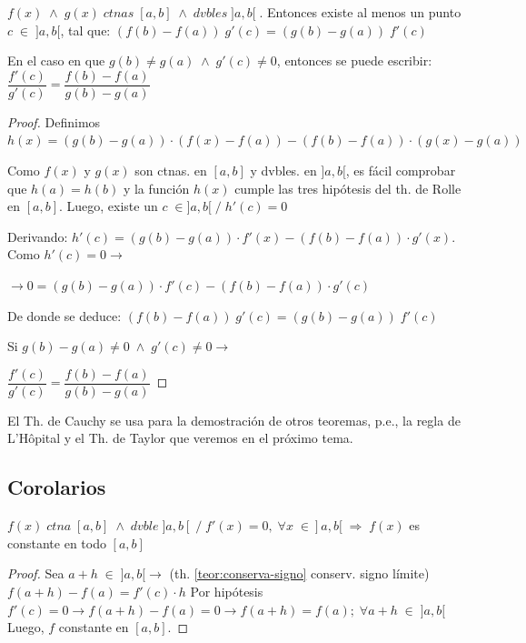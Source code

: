 	\begin{teor}
	\label{ThCauchy}
	$f(x) \;  \wedge \; g(x) \; ctnas\;  [a,b]\; \wedge \;  dvbles \;  ]a,b[ \; $. Entonces existe al menos un punto $c\; \in\; ]a,b[$, tal que:
	$\left(f(b)-f(a) \right)\; g'(c)= \left(g(b)-g(a) \right)\; f'(c)$
	
	En el caso en que $g(b) \neq g(a) \; \wedge \; g'(c)\neq 0$, entonces se puede escribir:
	$\dfrac{f'(c)}{g'(c)} = \dfrac {f(b)-f(a)}{g(b)-g(a)}$
	
	\end{teor}
	
	\begin{proof}
	Definimos $h(x)=(g(b)-g(a)) \cdot (f(x)-f(a)) - (f(b)-f(a)) \cdot (g(x)-g(a))$
	
	Como $f(x)$ y $g(x)$ son ctnas. en $[a,b]$ y dvbles. en $]a,b[$, es fácil comprobar que $h(a)=h(b)$ y la función $h(x)$ cumple las tres hipótesis del th. de Rolle en $[a,b]$. Luego, existe un $c\; \in ]a,b[ \; / \; h'(c)=0$
	
	Derivando: $h'(c)=(g(b)-g(a)) \cdot f'(x) - (f(b)-f(a)) \cdot g'(x)$. Como $h'(c)=0 \to $
	
	$\to 0=(g(b)-g(a)) \cdot f'(c) - (f(b)-f(a)) \cdot g'(c)$
	
	De donde se deduce: $\left(f(b)-f(a) \right)\; g'(c)= \left(g(b)-g(a) \right)\; f'(c)$
	
	Si $g(b)-g(a)\neq 0 \; \wedge \; g'(c)\neq 0 \to$
	
	$\dfrac{f'(c)}{g'(c)} = \dfrac {f(b)-f(a)}{g(b)-g(a)}$ 
	
	\end{proof}
	El Th. de Cauchy se usa para la demostración de otros teoremas, p.e., la regla de L'Hôpital y el Th. de Taylor que veremos en el próximo tema.
	
	\subsection {Corolarios}
	\begin{coro}  
		$f(x) \;   ctna\; [a,b] \;  \wedge \;  dvble \;  ]a,b[ \; / \; f'(x)=0, \; \forall x\; \in ]a,b[ \; \Rightarrow \; f(x)$ es constante en todo $[a,b]$
	\end{coro}
	
	\begin{proof}
		Sea $a+h\; \in\;  ]a,b[ \to $ (th. \ref{teor:conserva-signo} conserv. signo límite) $f(a+h)-f(a)=f'(c)\cdot h$ Por hipótesis $f'(c)=0\to f(a+h)-f(a)=0 \to f(a+h)=f(a);\; \forall a+h\; \in \; ]a,b[ $ Luego, $f$ constante en $[a,b]$.
	\end{proof}

